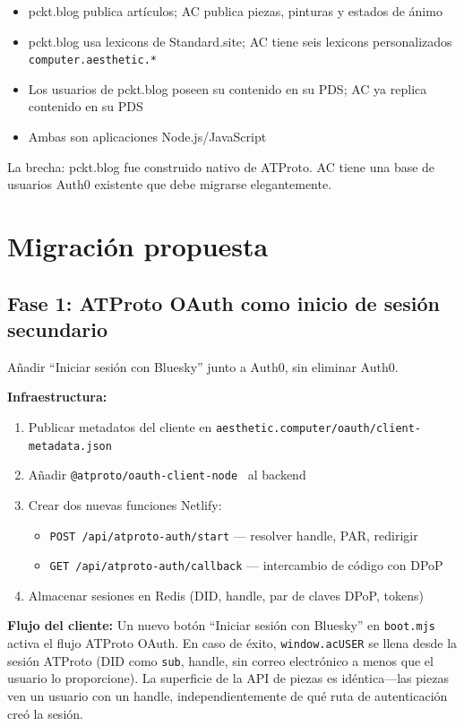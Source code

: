 \documentclass[10pt,letterpaper,twocolumn]{article}
\begin{document}
\begin{itemize}
  \item pckt.blog publica artículos; AC publica piezas, pinturas y estados de ánimo
  \item pckt.blog usa lexicons de Standard.site; AC tiene seis lexicons personalizados \texttt{computer.aesthetic.*}
  \item Los usuarios de pckt.blog poseen su contenido en su PDS; AC ya replica contenido en su PDS
  \item Ambas son aplicaciones Node.js/JavaScript
\end{itemize}

La brecha: pckt.blog fue construido nativo de ATProto. AC tiene una base de usuarios Auth0 existente que debe migrarse elegantemente.


\section{Migración propuesta}
\label{sec:migration}

\subsection{Fase 1: ATProto OAuth como inicio de sesión secundario}

Añadir ``Iniciar sesión con Bluesky'' junto a Auth0, sin eliminar Auth0.

\textbf{Infraestructura:}
\begin{enumerate}
  \item Publicar metadatos del cliente en \texttt{aesthetic.computer/oauth/client-metadata.json}
  \item Añadir \texttt{@atproto/oauth-client-node}~\citep{npmAtprotoOauth} al backend
  \item Crear dos nuevas funciones Netlify:
    \begin{itemize}
      \item \texttt{POST /api/atproto-auth/start} --- resolver handle, PAR, redirigir
      \item \texttt{GET /api/atproto-auth/callback} --- intercambio de código con DPoP
    \end{itemize}
  \item Almacenar sesiones en Redis (DID, handle, par de claves DPoP, tokens)
\end{enumerate}

\textbf{Flujo del cliente:} Un nuevo botón ``Iniciar sesión con Bluesky'' en \texttt{boot.mjs} activa el flujo ATProto OAuth. En caso de éxito, \texttt{window.acUSER} se llena desde la sesión ATProto (DID como \texttt{sub}, handle, sin correo electrónico a menos que el usuario lo proporcione). La superficie de la API de piezas es idéntica---las piezas ven un usuario con un handle, independientemente de qué ruta de autenticación creó la sesión.
\end{document}
